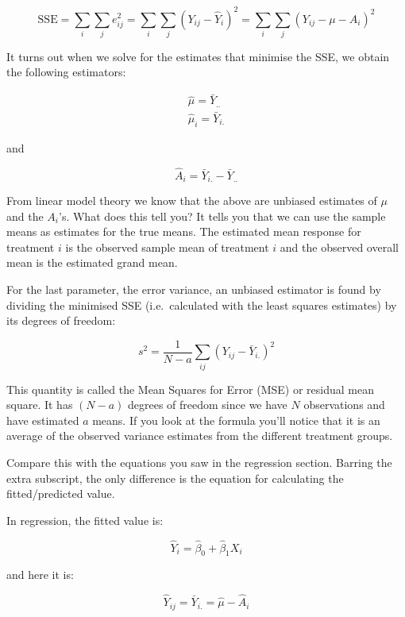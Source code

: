 \documentclass[
  letterpaper,
  DIV=11,
  numbers=noendperiod,
  oneside]{scrreprt}
\begin{document}
\[ \text{SSE} = \sum_i\sum_j e_{ij}^2 = \sum_i\sum_j (Y_{ij} - \hat{Y}_i)^2 = \sum_i\sum_j (Y_{ij} - \mu - A_i)^2\]

It turns out when we solve for the estimates that minimise the
SSE, we obtain the following estimators:

\[
\begin{aligned}
\hat{\mu} = \bar{Y}_{..} \\
\hat{\mu}_i = \bar{Y}_{i.}
\end{aligned}
\]

and

\[\hat{A}_i =  \bar{Y}_{i.} - \bar{Y}_{..}\]

From linear model theory we know that the above are unbiased
estimates of \(\mu\) and the
\(A_i\)'s. What does this tell you? It tells you that we can use the
sample means as estimates for the true means. The estimated mean
response for treatment \(i\) is the observed sample mean of treatment
\(i\) and the observed overall mean is the estimated grand mean.

For the last parameter, the error variance, an unbiased estimator is
found by dividing the minimised SSE (i.e.~calculated with the least
squares estimates) by its degrees of freedom:

\[ s^2 = \frac{1}{N-a}\sum_{ij}(Y_{ij} - \bar{Y}_{i.})^2 \]

This quantity is called the Mean Squares for Error (MSE) or residual
mean square. It has \((N-a)\) degrees of freedom since we have \(N\)
observations and have estimated \(a\) means. If you look at the formula
you'll notice that it is an average of the observed variance estimates
from the different treatment groups.

\begin{tcolorbox}[enhanced jigsaw, toprule=.15mm, colbacktitle=quarto-callout-caution-color!10!white, toptitle=1mm, left=2mm, colframe=quarto-callout-caution-color-frame, bottomrule=.15mm, titlerule=0mm, breakable, opacitybacktitle=0.6, colback=white, coltitle=black, opacityback=0, bottomtitle=1mm, title={Compare this with regression}, rightrule=.15mm, arc=.35mm, leftrule=.75mm]

Compare this with the equations you saw in the regression section.
Barring the extra subscript, the only difference is the equation for
calculating the fitted/predicted value.

In regression, the fitted value is:

\[ \hat{Y}_i = \hat{\beta}_0 + \hat{\beta}_1X_i \]

and here it is:

\[ \hat{Y}_{ij} = \bar{Y}_{i.} = \hat{\mu} - \hat{A}_i \]

\end{tcolorbox}
\end{document}
